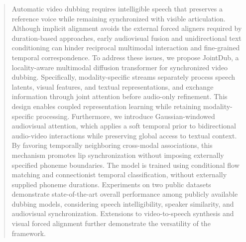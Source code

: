 \begin{abstract}
Automatic video dubbing requires intelligible speech that preserves a reference voice while remaining synchronized with visible articulation. Although implicit alignment avoids the external forced aligners required by duration-based approaches, early audiovisual fusion and unidirectional text conditioning can hinder reciprocal multimodal interaction and fine-grained temporal correspondence. To address these issues, we propose JointDub, a locality-aware multimodal diffusion transformer for synchronized video dubbing. Specifically, modality-specific streams separately process speech latents, visual features, and textual representations, and exchange information through joint attention before audio-only refinement. This design enables coupled representation learning while retaining modality-specific processing. Furthermore, we introduce Gaussian-windowed audiovisual attention, which applies a soft temporal prior to bidirectional audio-video interactions while preserving global access to textual context. By favoring temporally neighboring cross-modal associations, this mechanism promotes lip synchronization without imposing externally specified phoneme boundaries. The model is trained using conditional flow matching and connectionist temporal classification, without externally supplied phoneme durations. Experiments on two public datasets demonstrate state-of-the-art overall performance among publicly available dubbing models, considering speech intelligibility, speaker similarity, and audiovisual synchronization. Extensions to video-to-speech synthesis and visual forced alignment further demonstrate the versatility of the framework.
\end{abstract}

